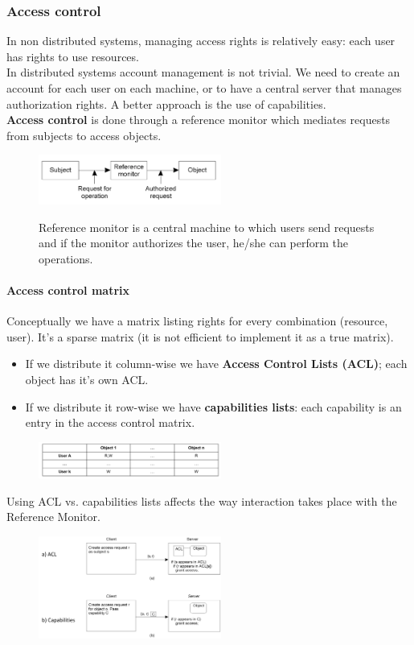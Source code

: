 \documentclass[10pt,a4paper]{article}
\begin{document}
\subsubsection{Access control}
In non distributed systems, managing access rights is relatively easy: each user has rights to use resources.\\
In distributed systems account management is not trivial. We need to create an account for each user on each machine, or to have a central server that manages authorization rights. A better approach is the use of capabilities. \\
\textbf{Access control} is done through a reference monitor which mediates requests from subjects to access objects.
\begin{figure}[h!]\hfill \includegraphics[width=170pt]{images/access-control.png}\hspace*{\fill}
  \label{fig:access-control}
  \caption{Reference monitor is a central machine to which users send requests and if the monitor authorizes the user, he/she can perform the operations.}
\end{figure}
\paragraph{Access control matrix}
Conceptually we have a matrix listing rights for every combination (resource, user). It's a sparse matrix (it is not efficient to implement it as a true matrix). 
\begin{itemize}
	\item If we distribute it column-wise we have \textbf{Access Control Lists (ACL)}; each object has it's own ACL. 
	\item	If we distribute it row-wise we have \textbf{capabilities lists}: each capability is an entry in the access control matrix.
	\end{itemize}
\begin{figure}[h!]\hfill \includegraphics[width=170pt]{images/access-control-matrix.png}\hspace*{\fill}
  \label{fig:access-control-matrix}
\end{figure}
Using ACL vs. capabilities lists affects the way interaction takes place with the Reference Monitor.
\begin{figure}[h!]\hfill \includegraphics[width=170pt]{images/acl-capabilities.png}\hspace*{\fill}
  \label{fig:acl-capabilities}
\end{figure}
\end{document}
